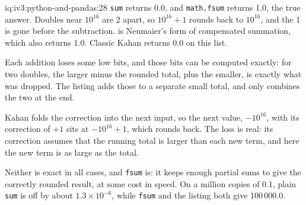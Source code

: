 \begin{solution}{iq:iv3:python-and-pandas:28}
\texttt{sum} returns 0.0, and \texttt{math.fsum} returns 1.0, the true answer. Doubles near $10^{16}$ are 2 apart, so $10^{16} + 1$ rounds back to $10^{16}$, and the 1 is gone before the subtraction.  is Neumaier's form of compensated summation, which also returns 1.0. Classic Kahan returns 0.0 on this list.
\label{lst:iv3:pp:neumaier}

Each addition loses some low bits, and those bits can be computed exactly: for two doubles, the larger minus the rounded total, plus the smaller, is exactly what was dropped. The listing adds those to a separate small total, and only combines the two at the end.

Kahan folds the correction into the next input, so the next value, $-10^{16}$, with its correction of $+1$ sits at $-10^{16} + 1$, which rounds back. The loss is real: its correction assumes that the running total is larger than each new term, and here the new term is as large as the total.

Neither is exact in all cases, and \texttt{fsum} is: it keeps enough partial sums to give the correctly rounded result, at some cost in speed. On a million copies of 0.1, plain \texttt{sum} is off by about $1.3 \times 10^{-6}$, while \texttt{fsum} and the listing both give 100\,000.0.

\end{solution}

